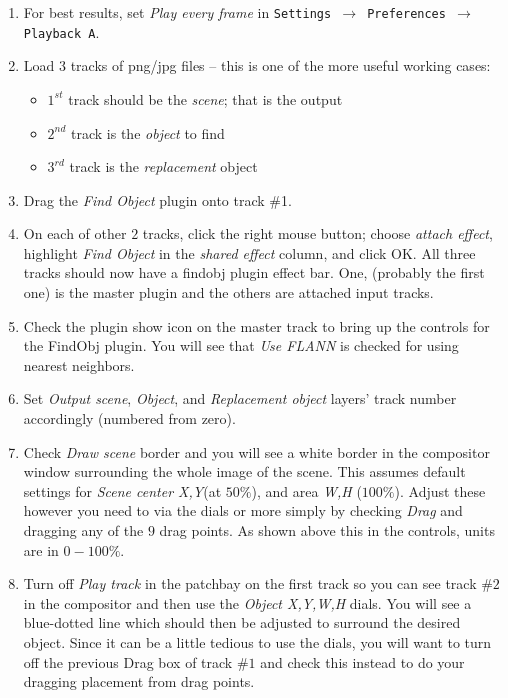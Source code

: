 \begin{enumerate}
    \item For best results, set \textit{Play every frame} in \texttt{Settings $\rightarrow$ Preferences $\rightarrow$ Play\-back A}.
    \item Load 3 tracks of png/jpg files – this is one of the more useful working cases:
    \begin{itemize}
        \item $1^{st}$ track should be the \textit{scene}; that is the output
        \item $2^{nd}$ track is the \textit{object} to find
        \item $3^{rd}$ track is the \textit{replacement} object        
    \end{itemize}
    \item Drag the \textit{Find Object} plugin onto track \#1.
    \item On each of other $2$ tracks, click the right mouse button; choose \textit{attach effect}, highlight \textit{Find Object} in the \textit{shared effect} column, and click OK. All three tracks should now have a findobj plugin effect bar. One, (probably the first one) is the master plugin and the others are attached input tracks.
    \item Check the plugin show icon on the master track to bring up the controls for the FindObj plugin. You will see that \textit{Use FLANN} is checked for using nearest neighbors.
    \item Set \textit{Output scene}, \textit{Object}, and \textit{Replacement object} layers’ track number accordingly (numbered from zero).
    \item Check \textit{Draw scene} border and you will see a white border in the compositor window surrounding the whole image of the scene. This assumes default settings for \textit{Scene center X,Y}(at $50\%$), and area \textit{W,H} ($100\%$). Adjust these however you need to via the dials or more simply by checking \textit{Drag} and dragging any of the $9$ drag points. As shown above this in the controls, units are in $0-100\%$.
    \item Turn off \textit{Play track} in the patchbay on the first track so you can see track $\#2$ in the compositor and then use the \textit{Object X,Y,W,H} dials. You will see a blue-dotted line which should then be adjusted to surround the desired object. Since it can be a little tedious to use the dials, you will want to turn off the previous Drag box of track $\#1$ and check this instead to do your dragging placement from drag points.

\end{enumerate}

